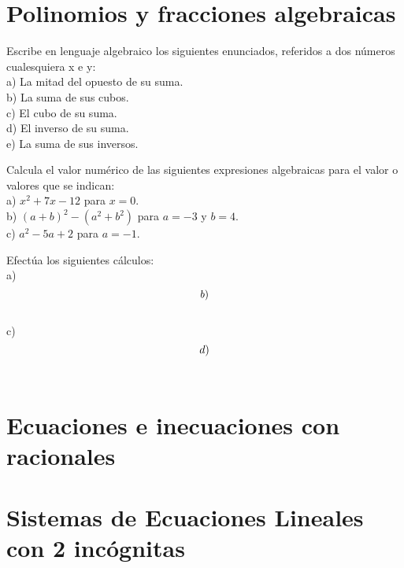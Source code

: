 
\section{Polinomios y fracciones algebraicas}

\begin{ejer}
Escribe en lenguaje algebraico los siguientes enunciados, referidos a dos números cualesquiera x e y: \\
a) La mitad del opuesto de su suma. \\
b) La suma de sus cubos. \\
c) El cubo de su suma. \\
d) El inverso de su suma. \\
e) La suma de sus inversos.
\end{ejer}

\begin{ejer}
Calcula el valor numérico de las siguientes expresiones algebraicas para el valor o valores que se indican: \\
a) $x^2 + 7x - 12$ para $x = 0$. \\
b) $(a + b)^2 - (a^2 + b^2)$ para $a = -3$ y $b = 4$. \\
c) $a^2 - 5a + 2$ para $a = -1$.
\end{ejer}

\begin{ejer}
Efectúa los siguientes cálculos: \\
a) $$ \\
b) $$ \\
c) $$ \\
d) $$ \\
\end{ejer}

\section{Ecuaciones e inecuaciones con racionales}

\begin{ejer}

\end{ejer}

\begin{ejer}

\end{ejer}

\begin{ejer}

\end{ejer}

\begin{ejer}

\end{ejer}

\begin{ejer}

\end{ejer}

\begin{ejer}

\end{ejer}

\section{Sistemas de Ecuaciones Lineales con 2 incógnitas}





